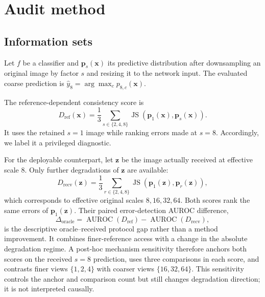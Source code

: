 \section{Audit method}

\subsection{Information sets}

Let \(f\) be a classifier and
\(\boldsymbol{p}_{s}(\mathbf{x})\) its predictive distribution after
downsampling an original image by factor \(s\) and resizing it to the network
input. The evaluated coarse prediction is
\(\hat{y}_{8}=\arg\max_c p_{8,c}(\mathbf{x})\).

The reference-dependent consistency score is
\begin{equation}
D_{\mathrm{ref}}(\mathbf{x}) =
\frac{1}{3}\sum_{s\in\{2,4,8\}}
\operatorname{JS}\!\left(
\boldsymbol{p}_{1}(\mathbf{x}),
\boldsymbol{p}_{s}(\mathbf{x})
\right).
\end{equation}
It uses the retained \(s=1\) image while ranking errors made at \(s=8\).
Accordingly, we label it a privileged diagnostic.

For the deployable counterpart, let \(\mathbf{z}\) be the image actually
received at effective scale 8. Only further degradations of \(\mathbf{z}\) are
available:
\begin{equation}
D_{\mathrm{recv}}(\mathbf{z}) =
\frac{1}{3}\sum_{r\in\{2,4,8\}}
\operatorname{JS}\!\left(
\boldsymbol{p}_{1}(\mathbf{z}),
\boldsymbol{p}_{r}(\mathbf{z})
\right),
\end{equation}
which corresponds to effective original scales \(8,16,32,64\). Both scores
rank the same errors of \(\boldsymbol{p}_{1}(\mathbf{z})\). Their paired
error-detection AUROC difference,
\begin{equation}
\Delta_{\mathrm{oracle}} =
\operatorname{AUROC}(D_{\mathrm{ref}})
-\operatorname{AUROC}(D_{\mathrm{recv}}),
\end{equation}
is the descriptive oracle--received protocol gap rather than a method
improvement. It combines finer-reference access with a change in the absolute
degradation regime. A post-hoc mechanism sensitivity therefore anchors both
scores on the received \(s=8\) prediction, uses three comparisons in each
score, and contrasts finer views \(\{1,2,4\}\) with coarser views
\(\{16,32,64\}\). This sensitivity controls the anchor and comparison count but
still changes degradation direction; it is not interpreted causally.

